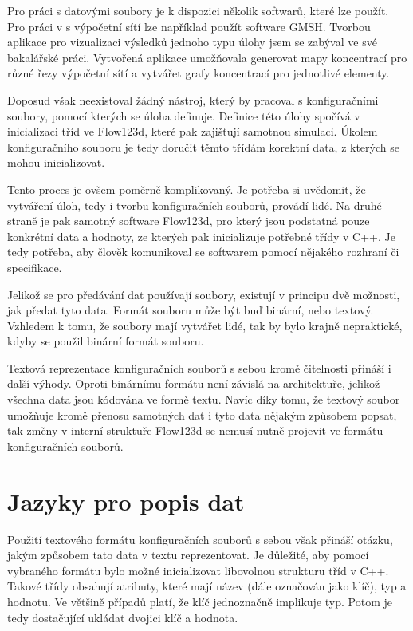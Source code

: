 \documentclass[FM,DP]{tulthesis}
\begin{document}
Pro práci s datovými soubory je k dispozici několik softwarů, které lze použít. Pro práci v s výpočetní sítí lze například použít software GMSH. Tvorbou aplikace pro vizualizaci výsledků jednoho typu úlohy jsem se zabýval ve své bakalářské práci. Vytvořená aplikace umožňovala generovat mapy koncentrací pro různé řezy výpočetní sítí a vytvářet grafy koncentrací pro jednotlivé elementy.

Doposud však neexistoval žádný nástroj, který by pracoval s konfiguračními soubory, pomocí kterých se úloha definuje. Definice této úlohy spočívá v inicializaci tříd ve Flow123d, které pak zajišťují samotnou simulaci. Úkolem konfiguračního souboru je tedy doručit těmto třídám korektní data, z kterých se mohou inicializovat.

Tento proces je ovšem poměrně komplikovaný. Je potřeba si uvědomit, že vytváření úloh, tedy i tvorbu konfiguračních souborů, provádí lidé. Na druhé straně je pak samotný software Flow123d, pro který jsou podstatná pouze konkrétní data a hodnoty, ze kterých pak inicializuje potřebné třídy v C++. Je tedy potřeba, aby člověk komunikoval se softwarem pomocí nějakého rozhraní či specifikace.

Jelikož se pro předávání dat používají soubory, existují v principu dvě možnosti, jak předat tyto data. Formát souboru může být buď binární, nebo textový. Vzhledem k tomu, že soubory mají vytvářet lidé, tak by bylo krajně nepraktické, kdyby se použil binární formát souboru.

Textová reprezentace konfiguračních souborů s sebou kromě čitelnosti přináší i další výhody. Oproti binárnímu formátu není závislá na architektuře, jelikož všechna data jsou kódována ve formě textu. Navíc díky tomu, že textový soubor umožňuje kromě přenosu samotných dat i tyto data nějakým způsobem popsat, tak změny v interní struktuře Flow123d se nemusí nutně projevit ve formátu konfiguračních souborů.


\section{Jazyky pro popis dat}

Použití textového formátu konfiguračních souborů s sebou však přináší otázku, jakým způsobem tato data v textu reprezentovat. Je důležité, aby pomocí vybraného formátu bylo možné inicializovat libovolnou strukturu tříd v C++. Takové třídy obsahují atributy, které mají název (dále označován jako klíč), typ a hodnotu. Ve většině případů platí, že klíč jednoznačně implikuje typ. Potom je tedy dostačující ukládat dvojici klíč a hodnota.
\end{document}
